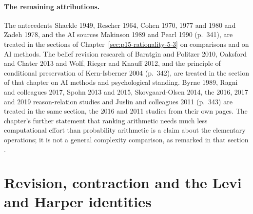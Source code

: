 \paragraph{The remaining attributions.}
The antecedents Shackle 1949, Rescher 1964, Cohen 1970, 1977 and 1980 and
Zadeh 1978, and the AI sources Makinson 1989 and Pearl 1990 (p.~341), are
treated in the sections of Chapter~\ref{sec:p15-rationality-5-3}
on comparisons and on AI methods.  The belief
revision research of Baratgin and Politzer 2010, Oaksford and Chater 2013 and
Wolf, Rieger and Knauff 2012, and the principle of conditional preservation
of Kern-Isberner 2004 (p.~342), are treated in the section of that chapter on AI methods and
psychological standing.  Byrne 1989, Ragni and colleagues 2017, Spohn 2013 and
2015, Skovgaard-Olsen 2014, the 2016, 2017 and 2019 reason-relation studies
and Juslin and colleagues 2011 (p.~343) are treated in the same section, the
2016 and 2011 studies from their own pages.  The chapter's further statement
that ranking arithmetic needs much less computational effort than probability
arithmetic is a claim about the elementary operations; it is not a general
complexity comparison, as remarked in that section
\parencite[pp.~341--343]{KernIsbernerSkovgaardOlsenSpohn2021Ranking}.

\section{Revision, contraction and the Levi and Harper identities}
\label{sec:p15-w02b-p15-039-levi-harper}

